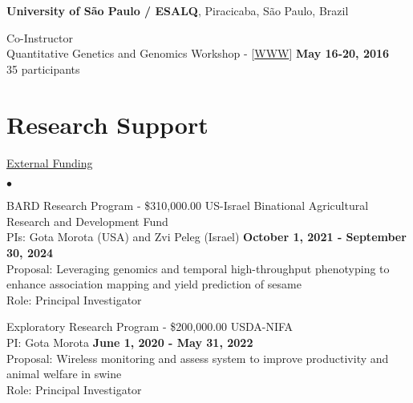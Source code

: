\documentclass[margin,line,10pt]{res}
\newenvironment{list2}{
  \begin{list}{$\bullet$}{%
      \setlength{\itemsep}{0in}
      \setlength{\parsep}{0in} \setlength{\parskip}{0in}
      \setlength{\topsep}{0in} \setlength{\partopsep}{0in} 
      \setlength{\leftmargin}{0.2in}}}{\end{list}}
\begin{document}
\begin{resume}
\section{}


{\bf University of S\~{a}o Paulo / ESALQ}, Piracicaba, S\~{a}o Paulo, Brazil
\vspace{.01pt}


Co-Instructor  \\
Quantitative Genetics and Genomics Workshop - [\textcolor{blue}{\href{http://morotalab.org/ESALQ2016/ESALQ2016.html}{WWW}}]
\hfill {\bf May 16-20, 2016} \\
35 participants  






\vspace{0.5cm}
\section{\sc Research Support}
\begin{flushleft}
\hspace{0.2cm} \underline{External Funding}
\end{flushleft}

\begin{list2}

\item BARD Research Program - \$310,000.00  \hfill US-Israel Binational Agricultural Research and Development Fund \\
  PIs: Gota Morota (USA) and Zvi Peleg (Israel)   \hfill \textbf{October 1, 2021 -  September 30, 2024}\\
Proposal: Leveraging genomics and temporal high-throughput phenotyping to enhance association mapping and yield prediction of sesame  \\
Role: Principal Investigator \\


\vspace{0.5cm}


\item Exploratory Research Program - \$200,000.00  \hfill USDA-NIFA\\
  PI: Gota Morota   \hfill \textbf{June 1, 2020 -  May 31, 2022}\\
Proposal: Wireless monitoring and assess system to improve productivity and animal welfare in swine  \\
Role: Principal Investigator \\



\end{list2}
\end{resume}
\end{document}
